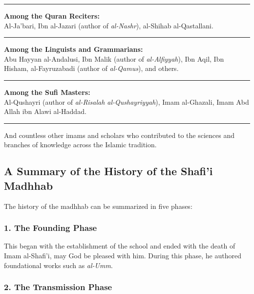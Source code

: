 \documentclass[
  a4paper,
  DIV=11,
  numbers=noendperiod]{scrartcl}
\begin{document}
\begin{center}\rule{0.5\linewidth}{0.5pt}\end{center}

\textbf{Among the Quran Reciters:}\\
Al-Ja'bari, Ibn al-Jazari (author of \emph{al-Nashr}), al-Shihab
al-Qastallani.

\begin{center}\rule{0.5\linewidth}{0.5pt}\end{center}

\textbf{Among the Linguists and Grammarians:}\\
Abu Hayyan al-Andalusi, Ibn Malik (author of \emph{al-Alfiyyah}), Ibn
Aqil, Ibn Hisham, al-Fayruzabadi (author of \emph{al-Qamus}), and
others.

\begin{center}\rule{0.5\linewidth}{0.5pt}\end{center}

\textbf{Among the Sufi Masters:}\\
Al-Qushayri (author of \emph{al-Risalah al-Qushayriyyah}), Imam
al-Ghazali, Imam Abd Allah ibn Alawi al-Haddad.

\begin{center}\rule{0.5\linewidth}{0.5pt}\end{center}

And countless other imams and scholars who contributed to the sciences
and branches of knowledge across the Islamic tradition.

\subsection{A Summary of the History of the Shafi'i
Madhhab}\label{a-summary-of-the-history-of-the-shafii-madhhab}

The history of the madhhab can be summarized in five phases:

\subsubsection{1. The Founding Phase}\label{the-founding-phase}

This began with the establishment of the school and ended with the death
of Imam al-Shafi'i, may God be pleased with him. During this phase, he
authored foundational works such as \emph{al-Umm}.

\subsubsection{2. The Transmission Phase}\label{the-transmission-phase}
\end{document}
